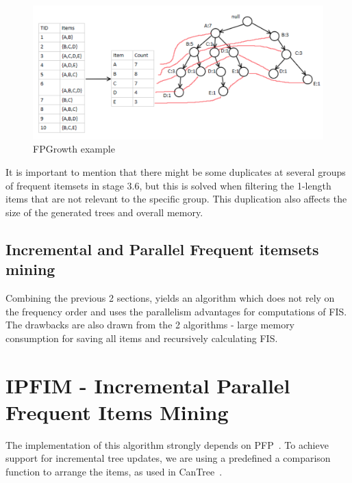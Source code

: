 \documentclass[sigconf, nonacm]{acmart}
\begin{document}
\begin{figure}
  \centering
  \includegraphics[width=\linewidth]{figures/fpgrowthexample}
  \caption{FPGrowth example}
  \label{fig:fpgrowthexample}
\end{figure}

It is important to mention that there might be some duplicates at several groups of frequent itemsets in stage 3.6, but this is solved when filtering the 1-length items that are not relevant to the specific group. This duplication also affects the size of the generated trees and overall memory.

\subsection{Incremental and Parallel Frequent itemsets mining}

Combining the previous 2 sections, yields an algorithm which does not rely on the frequency order and uses the parallelism advantages for computations of FIS.
The drawbacks are also drawn from the 2 algorithms - large memory consumption for saving all items and recursively calculating FIS.

\section{IPFIM - Incremental Parallel Frequent Items Mining}
The implementation of this algorithm strongly depends on PFP~\cite{li2008pfp}. To achieve support for incremental tree updates, we are using a predefined a comparison function to arrange the items, as used in CanTree~\cite{leung2005cantree}.
\end{document}
